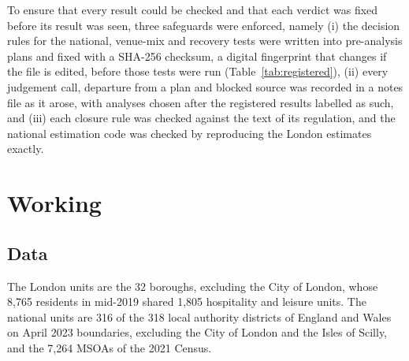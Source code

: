 \documentclass[11pt,a4paper]{article}
\begin{document}
To ensure that every result could be checked and that each verdict was fixed before its result was seen, three safeguards were enforced, namely (i) the decision rules for the national, venue-mix and recovery tests were written into pre-analysis plans and fixed with a SHA-256 checksum, a digital fingerprint that changes if the file is edited, before those tests were run (Table~\ref{tab:registered}), (ii) every judgement call, departure from a plan and blocked source was recorded in a notes file as it arose, with analyses chosen after the registered results labelled as such, and (iii) each closure rule was checked against the text of its regulation, and the national estimation code was checked by reproducing the London estimates exactly.

\section{Working}

\subsection{Data}

The London units are the 32 boroughs, excluding the City of London, whose 8,765 residents in mid-2019 shared 1,805 hospitality and leisure units. The national units are 316 of the 318 local authority districts of England and Wales on April 2023 boundaries, excluding the City of London and the Isles of Scilly, and the 7,264 MSOAs of the 2021 Census.
\end{document}
